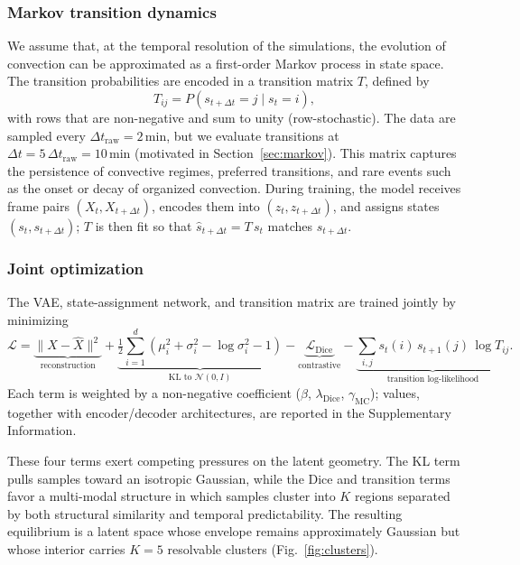\documentclass[11pt]{article}
\begin{document}
\subsubsection{Markov transition dynamics}

We assume that, at the temporal resolution of the simulations, the evolution of convection can be approximated as a first-order Markov process in state space. The transition probabilities are encoded in a transition matrix $T$, defined by
\[
T_{ij} = P(s_{t+\Delta t} = j \mid s_t = i),
\]
with rows that are non-negative and sum to unity (row-stochastic). The data are sampled every $\Delta t_\text{raw}=2\,\mathrm{min}$, but we evaluate transitions at $\Delta t = 5\,\Delta t_\text{raw} = 10\,\mathrm{min}$ (motivated in Section~\ref{sec:markov}). This matrix captures the persistence of convective regimes, preferred transitions, and rare events such as the onset or decay of organized convection. During training, the model receives frame pairs $(X_t, X_{t+\Delta t})$, encodes them into $(z_t, z_{t+\Delta t})$, and assigns states $(s_t, s_{t+\Delta t})$; $T$ is then fit so that $\hat{s}_{t+\Delta t} = T\, s_t$ matches $s_{t+\Delta t}$.

\subsubsection{Joint optimization}

The VAE, state-assignment network, and transition matrix are trained jointly by minimizing
\[
\mathcal{L} =
\underbrace{\|X - \hat{X}\|^2}_{\text{reconstruction}}
+
\underbrace{\tfrac{1}{2}\sum_{i=1}^d \left(\mu_i^2 + \sigma_i^2 - \log \sigma_i^2 - 1\right)}_{\text{KL to } \mathcal{N}(0,I)}
-
\underbrace{\mathcal{L}_{\mathrm{Dice}}}_{\text{contrastive}}
-
\underbrace{\sum_{i,j} s_t(i)\, s_{t+1}(j)\, \log T_{ij}}_{\text{transition log-likelihood}}.
\]
Each term is weighted by a non-negative coefficient ($\beta$, $\lambda_{\mathrm{Dice}}$, $\gamma_{\mathrm{MC}}$); values, together with encoder/decoder architectures, are reported in the Supplementary Information.

These four terms exert competing pressures on the latent geometry. The KL term pulls samples toward an isotropic Gaussian, while the Dice and transition terms favor a multi-modal structure in which samples cluster into $K$ regions separated by both structural similarity and temporal predictability. The resulting equilibrium is a latent space whose envelope remains approximately Gaussian but whose interior carries $K=5$ resolvable clusters (Fig.~\ref{fig:clusters}).
\end{document}
